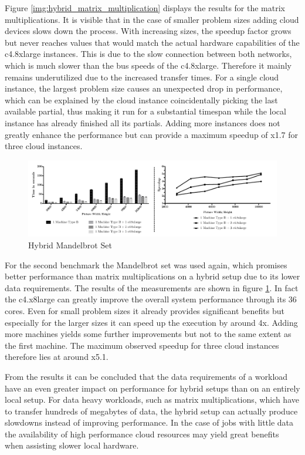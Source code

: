 Figure \ref{img:hybrid_matrix_multiplication} displays the results for the matrix multiplications. It is visible that in the case of smaller problem sizes adding cloud devices slows down the process. With increasing sizes, the speedup factor grows but never reaches values that would match the actual hardware capabilities of the c4.8xlarge instances. This is due to the slow connection between both networks, which is much slower than the bus speeds of the c4.8xlarge. Therefore it mainly remains underutilized due to the increased transfer times. For a single cloud instance, the largest problem size causes an unexpected drop in performance, which can be explained by the cloud instance coincidentally picking the last available partial, thus making it run for a substantial timespan while the local instance has already finished all its partials. Adding more instances does not greatly enhance the performance but can provide a maximum speedup of x1.7 for three cloud instances.


\begin{figure}[H]
	\includegraphics[width=1.0\textwidth]{images/hybrid_mandelbrot_performance.pdf}
	\centering
	\caption{Hybrid Mandelbrot Set}
	\label{img:hybrid_mandelbrot}
\end{figure}

For the second benchmark the Mandelbrot set was used again, which promises better performance than matrix multiplications on a hybrid setup due to its lower data requirements. The results of the measurements are shown in figure \ref{img:hybrid_mandelbrot}. In fact the c4.x8large can greatly improve the overall system performance through its 36 cores. Even for small problem sizes it already provides significant benefits but especially for the larger sizes it can speed up the execution by around 4x. Adding more machines yields some further improvements but not to the same extent as the first machine. The maximum observed speedup for three cloud instances therefore lies at around x5.1.

From the results it can be concluded that the data requirements of a workload have an even greater impact on performance for hybrid setups than on an entirely local setup. For data heavy workloads, such as matrix multiplications, which have to transfer hundreds of megabytes of data, the hybrid setup can actually produce slowdowns instead of improving performance. In the case of jobs with little data the availability of high performance cloud resources may yield great benefits when assisting slower local hardware.

